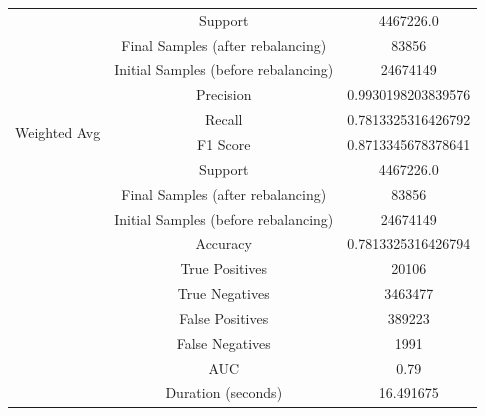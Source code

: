 \begin{longtable}{|c|c|c|}
 & Support & 4467226.0 \\
 & Final Samples (after rebalancing) & 83856 \\
 & Initial Samples (before rebalancing) & 24674149 \\
\hline
\multirow{4}{*}{Weighted Avg} & Precision & 0.9930198203839576 \\
 & Recall & 0.7813325316426792 \\
 & F1 Score & 0.8713345678378641 \\
 & Support & 4467226.0 \\
 & Final Samples (after rebalancing) & 83856 \\
 & Initial Samples (before rebalancing) & 24674149 \\
\hline
& Accuracy & 0.7813325316426794 \\ \hline
& True Positives & 20106 \\ \hline
& True Negatives & 3463477 \\ \hline
& False Positives & 389223 \\ \hline
& False Negatives & 1991 \\ \hline
& AUC & 0.79 \\ \hline
& Duration (seconds) & 16.491675 \\ \hline
\end{longtable}



